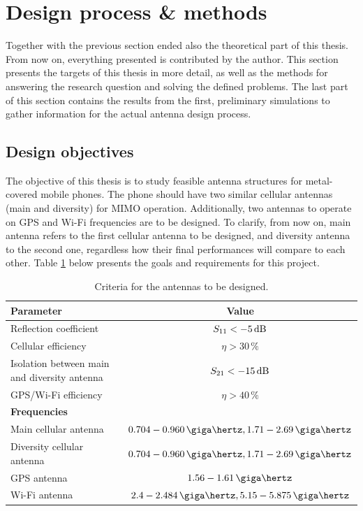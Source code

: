 \section{Design process \& methods}
\label{sec:ojectives}
Together with the previous section ended also the theoretical part of this thesis. From now on, everything presented is contributed by the author. This section presents the targets of this thesis in more detail, as well as the methods for answering the research question and solving the defined problems. The last part of this section contains the results from the first, preliminary simulations to gather information for the actual antenna design process.

\subsection{Design objectives}
The objective of this thesis is to study feasible antenna structures for metal-covered mobile phones. The phone should have two similar cellular antennas (main and diversity) for MIMO operation. Additionally, two antennas to operate on GPS and Wi-Fi frequencies are to be designed. To clarify, from now on, main antenna refers to the first cellular antenna to be designed, and diversity antenna to the second one, regardless how their final performances will compare to each other. Table \ref{tab:design_goals} below presents the goals and requirements for this project.

\begin{table}[H]
    \centering
    \caption{Criteria for the antennas to be designed.}
    \label{tab:design_goals}
    \begin{tabular}{|l|c|}
        \hline
         \textbf{Parameter} & \textbf{Value} \\
         \hline
         Reflection coefficient & $S_{11} < -5\,\mathrm{dB}$\\
         \hline
         Cellular efficiency & $\eta > 30\,\%$\\
         \hline
         Isolation between main and diversity antenna & $S_{21} < -15\,\mathrm{dB}$\\
         \hline
         GPS/Wi-Fi efficiency & $\eta > 40\,\%$\\
         \hline\hline
         \textbf{Frequencies} & \\
         \hline
         Main cellular antenna & $0.704-0.960\,\giga\hertz, 1.71-2.69\,\giga\hertz$\\
         \hline
         Diversity cellular antenna & $0.704-0.960\,\giga\hertz, 1.71-2.69\,\giga\hertz$\\
         \hline
         GPS antenna & $1.56-1.61\,\giga\hertz$\\
         \hline
         Wi-Fi antenna & $2.4-2.484\,\giga\hertz, 5.15-5.875\,\giga\hertz$\\
         \hline
    \end{tabular}
\end{table}



